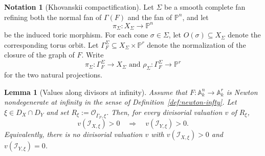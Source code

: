 \documentclass[12pt]{amsart}
\newcommand{\kk}{k}
\newcommand{\PP}{\mathbb{P}}
\renewcommand{\AA}{\mathbb{A}}
\newcommand{\cO}{\mathcal{O}}
\theoremstyle{plain}
\newtheorem{lemma}[theorem]{Lemma}
\theoremstyle{definition}
\newtheorem{notation}[theorem]{Notation}
\numberwithin{equation}{section}
\begin{document}
\begin{notation}[Khovanskii compactification]\label{notation:Khovanskii}
	Let $\Sigma$ be a smooth complete fan refining both the normal fan of $\Gamma(F)$
	and the fan of $\PP^n$, and let
	\[
	\pi_\Sigma:X_\Sigma\to \PP^n
	\]
	be the induced toric morphism.  For each cone $\sigma\in\Sigma$, let
	$O(\sigma)\subseteq X_\Sigma$ denote the corresponding torus orbit.
	Let $\Gamma_F^\Sigma\subseteq X_\Sigma\times \PP^r$ denote the normalization of the
	closure of the graph of $F$.  Write
	\[
	\pi_\Sigma:\Gamma_F^\Sigma\to X_\Sigma \text{ and }
	\rho_\Sigma:\Gamma_F^\Sigma\to \PP^r
	\]
	for the two natural projections.
\end{notation}

\begin{lemma}[Values along divisors at infinity]\label{lem:bridge-nnd}
	Assume that $F:\AA^n_\kk\to\AA^r_\kk$ is Newton nondegenerate at infinity in the sense of
	Definition~\ref{def:newton-infty}.
	Let $\xi\in D_X\cap D_Y$ and set $R_\xi:=\cO_{\overline{\Gamma}_F,\xi}$.
	Then, for every divisorial valuation $v$ of $R_\xi$,
	\[
	v(\mathscr I_{X,\xi})>0\quad\Longrightarrow\quad v(\mathscr I_{Y,\xi})>0.
	\]
	Equivalently, there is no divisorial valuation $v$ with $v(\mathscr I_{X,\xi})>0$ and $v(\mathscr I_{Y,\xi})=0$.
\end{lemma}
\end{document}
